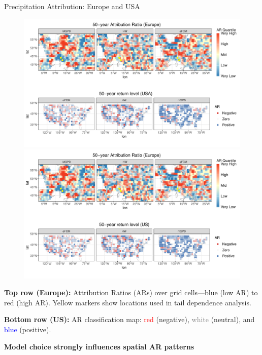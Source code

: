\documentclass[final]{beamer}
\newlength{\colwidth}
\begin{document}
\begin{frame}[t]
\begin{columns}[t]
\begin{column}{\colwidth}
\begin{block}{Precipitation Attribution: Europe and USA}
\begin{figure}
  \centering
  \includegraphics[width=\linewidth]{Figures/poster_map-eu.pdf}
  \includegraphics[width=\linewidth]{Figures/poster_map-us.pdf}
\end{figure}

\vspace{-15pt}
\textbf{Top row (Europe):} Attribution Ratios (ARs) over grid cells—blue (low AR) to red (high AR). Yellow markers show locations used in tail dependence analysis.

\textbf{Bottom row (US):} AR classification map: \textcolor{red}{red} (negative), \textcolor{gray}{white} (neutral), and \textcolor{blue}{blue} (positive).

\vspace{-0.5cm}
\begin{center}
\colorbox{cyan!10}{%
  \parbox{0.7\linewidth}{%
    \centering
     \textbf{Model choice strongly influences spatial AR patterns}
  }
}
\end{center}



\end{block}
\end{column}
\end{columns}
\end{frame}
\end{document}
